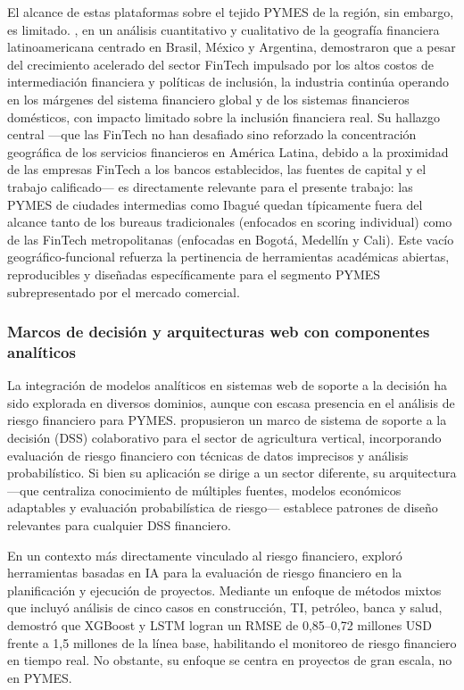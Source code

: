 \documentclass[12pt, letterpaper]{article}
\begin{document}
El alcance de estas plataformas sobre el tejido PYMES de la regi\'on, sin embargo, es limitado. \citet{Ioannou2022}, en un an\'alisis cuantitativo y cualitativo de la geograf\'ia financiera latinoamericana centrado en Brasil, M\'exico y Argentina, demostraron que a pesar del crecimiento acelerado del sector FinTech impulsado por los altos costos de intermediaci\'on financiera y pol\'iticas de inclusi\'on, la industria contin\'ua operando en los m\'argenes del sistema financiero global y de los sistemas financieros dom\'esticos, con impacto limitado sobre la inclusi\'on financiera real. Su hallazgo central ---que las FinTech no han desafiado sino reforzado la concentraci\'on geogr\'afica de los servicios financieros en Am\'erica Latina, debido a la proximidad de las empresas FinTech a los bancos establecidos, las fuentes de capital y el trabajo calificado--- es directamente relevante para el presente trabajo: las PYMES de ciudades intermedias como Ibagu\'e quedan t\'ipicamente fuera del alcance tanto de los bureaus tradicionales (enfocados en scoring individual) como de las FinTech metropolitanas (enfocadas en Bogot\'a, Medell\'in y Cali). Este vac\'io geogr\'afico-funcional refuerza la pertinencia de herramientas acad\'emicas abiertas, reproducibles y dise\~nadas espec\'ificamente para el segmento PYMES subrepresentado por el mercado comercial.

\subsubsection{Marcos de decisi\'on y arquitecturas web con componentes anal\'iticos}

La integraci\'on de modelos anal\'iticos en sistemas web de soporte a la decisi\'on ha sido explorada en diversos dominios, aunque con escasa presencia en el an\'alisis de riesgo financiero para PYMES. \citet{BaumontDeOliveira2021} propusieron un marco de sistema de soporte a la decisi\'on (DSS) colaborativo para el sector de agricultura vertical, incorporando evaluaci\'on de riesgo financiero con t\'ecnicas de datos imprecisos y an\'alisis probabil\'istico. Si bien su aplicaci\'on se dirige a un sector diferente, su arquitectura ---que centraliza conocimiento de m\'ultiples fuentes, modelos econ\'omicos adaptables y evaluaci\'on probabil\'istica de riesgo--- establece patrones de dise\~no relevantes para cualquier DSS financiero.

En un contexto m\'as directamente vinculado al riesgo financiero, \citet{Sholapurapu2024} explor\'o herramientas basadas en IA para la evaluaci\'on de riesgo financiero en la planificaci\'on y ejecuci\'on de proyectos. Mediante un enfoque de m\'etodos mixtos que incluy\'o an\'alisis de cinco casos en construcci\'on, TI, petr\'oleo, banca y salud, demostr\'o que XGBoost y LSTM logran un RMSE de 0,85--0,72 millones USD frente a 1,5 millones de la l\'inea base, habilitando el monitoreo de riesgo financiero en tiempo real. No obstante, su enfoque se centra en proyectos de gran escala, no en PYMES.
\end{document}
